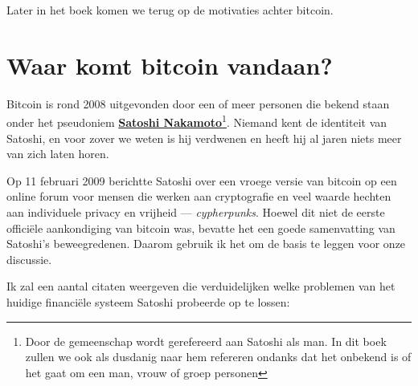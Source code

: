 \documentclass[smalldemyvopaper,11pt,twoside,onecolumn,openright,extrafontsizes]{memoir}
\begin{document}
\noindent Later in het boek komen we terug op de motivaties achter bitcoin.

\section{Waar komt bitcoin vandaan?}

Bitcoin is rond 2008 uitgevonden door een of meer personen die bekend staan onder het pseudoniem  \href{https://nl.wikipedia.org/wiki/Satoshi_Nakamoto}{\textbf{Satoshi Nakamoto}}\footnote{Door de gemeenschap wordt gerefereerd aan Satoshi als man. In dit boek zullen we ook als dusdanig naar hem refereren ondanks dat het onbekend is of het gaat om een man, vrouw of groep personen}. Niemand kent de identiteit van Satoshi, en voor zover we weten is hij verdwenen en heeft hij al jaren niets meer van zich laten horen.

Op 11 februari 2009 berichtte Satoshi over een vroege versie van bitcoin op een online forum voor mensen die werken aan cryptografie en veel waarde hechten aan individuele privacy en vrijheid --- \textit{cypherpunks}. Hoewel dit niet de eerste officiële aankondiging van bitcoin was, bevatte het een goede samenvatting van Satoshi's beweegredenen. Daarom gebruik ik het om de basis te leggen voor onze discussie.

Ik zal een aantal citaten weergeven die verduidelijken welke problemen van het huidige financiële systeem Satoshi probeerde op te lossen:
\end{document}
